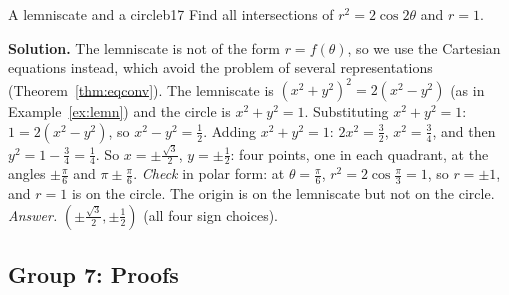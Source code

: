 \documentclass[11pt]{article}
\begin{document}
\begin{center}
\end{center}

\begin{exmp}{A lemniscate and a circle}{b17}
Find all intersections of $r^2=2\cos2\theta$ and $r=1$.

\textbf{Solution.} The lemniscate is not of the form $r=f(\theta)$, so we use the Cartesian equations instead, which avoid the problem of several representations (Theorem~\ref{thm:eqconv}). The lemniscate is $(x^2+y^2)^2=2(x^2-y^2)$ (as in Example~\ref{ex:lemn}) and the circle is $x^2+y^2=1$. Substituting $x^2+y^2=1$: $1=2(x^2-y^2)$, so $x^2-y^2=\frac12$. Adding $x^2+y^2=1$: $2x^2=\frac32$, $x^2=\frac34$, and then $y^2=1-\frac34=\frac14$. So $x=\pm\frac{\sqrt3}2$, $y=\pm\frac12$: four points, one in each quadrant, at the angles $\pm\frac\pi6$ and $\pi\pm\frac\pi6$. \emph{Check} in polar form: at $\theta=\frac\pi6$, $r^2=2\cos\frac\pi3=1$, so $r=\pm1$, and $r=1$ is on the circle. The origin is on the lemniscate but not on the circle. \emph{Answer.} $\left(\pm\frac{\sqrt3}2,\pm\frac12\right)$ (all four sign choices).
\end{exmp}

\subsection*{Group 7: Proofs}
\end{document}
